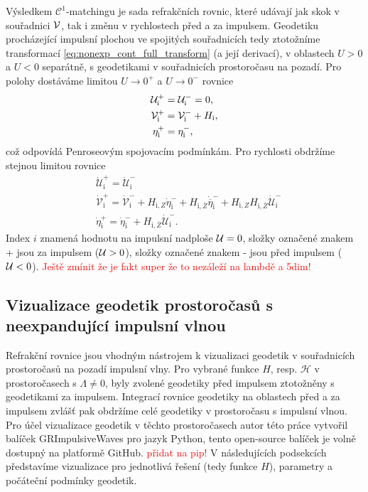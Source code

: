 Výsledkem $\mathcal{C}^1$-matchingu je sada refrakčních rovnic, které udávají jak skok v souřadnici $\mathcal{V}$,
tak i změnu v rychlostech před a za impulsem. Geodetiku procházející impulsní plochou ve spojitých souřadnicích tedy
ztotožníme transformací \eqref{eq:nonexp_cont_full_transform} (a její derivací), v oblastech $U > 0$ a $U < 0$ separátně, s geodetikami v souřadnicích prostoročasu na pozadí.
Pro polohy dostáváme limitou $U \to 0^+$ a $U \to 0^-$ rovnice
\begin{equation}
    \label{eq_refraction_nonexpanding_positions}
    \begin{split}
        \mathcal{U}^{+}_{\mathrm{i}} &= \mathcal{U}^{-}_{\mathrm{i}} = 0,\\
        \mathcal{V}^{+}_{\mathrm{i}} &= \mathcal{V}^{-}_{\mathrm{i}} + H_{\mathrm{i}},\\
        \eta^{+}_{\mathrm{i}} &= \eta^{-}_{\mathrm{i}},
    \end{split}
\end{equation}
což odpovídá Penroseovým spojovacím podmínkám. Pro rychlosti obdržíme stejnou limitou rovnice
\begin{equation}
    \label{eq:refraction_nonexpanding_velocities}
    \begin{split}
        &\dot{\mathcal{U}}^{+}_{\mathrm{i}} = \dot{\mathcal{U}}^{-}_{\mathrm{i}}\\
        &\dot{\mathcal{V}}^{+}_{\mathrm{i}} = \dot{\mathcal{V}}_{\mathrm{i}}^{-} + H_{\mathrm{i}, Z}
        \dot{\eta}^{-}_{\mathrm{i}} + H_{\mathrm{i}, \bar{Z}} \dot{\overline{\eta}}^{-}_{\mathrm{i}} + 
        H_{\mathrm{i}, Z} H_{\mathrm{i}, \bar{Z}} \dot{\mathcal{U}}_{\mathrm{i}}^{-}\\
        &\dot{\eta}_{\mathrm{i}}^{+} =\dot{\eta}_{\mathrm{i}}^{-}+H_{\mathrm{i}, \bar{Z}}
        \dot{\mathcal{U}}_{\mathrm{i}}^{-}.
    \end{split}
\end{equation}
Index $i$ znamená hodnotu na impulsní nadploše $\mathcal{U} = 0$, složky označené znakem + jsou za impulsem ($\mathcal{U} > 0$),
složky označené znakem - jsou před impulsem ($\mathcal{U} <0$).
\textcolor{red}{Ještě zmínit že je fakt super že to nezáleží na lambdě a 5dim!}
\subsection{Vizualizace geodetik prostoročasů s neexpandující impulsní vlnou}
Refrakční rovnice jsou vhodným nástrojem k vizualizaci geodetik v souřadnicích prostoročasů na pozadí impulsní vlny.
Pro vybrané funkce $H$, resp. $\mathcal{H}$ v prostoročasech s $\Lambda \neq 0$, byly zvolené geodetiky před impulsem ztotožněny
s geodetikami za impulsem. Integrací rovnice geodetiky na oblastech před a za impulsem zvlášť pak obdržíme celé geodetiky v prostoročasu s
impulsní vlnou. Pro účel vizualizace geodetik v těchto prostoročasech autor této práce vytvořil balíček GRImpulsiveWaves pro jazyk Python,
tento open-source balíček je volně dostupný na platformě GitHub. \textcolor{red}{přidat na pip!} V následujících podsekcích
představíme vizualizace pro jednotlivá řešení (tedy funkce $H$), parametry a počáteční podmínky geodetik.

